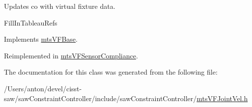 Updates co with virtual fixture data. 

Fill\+In\+Tableau\+Refs 

Implements \hyperlink{classmts_v_f_base_aef5a28675f79945766a2b114c957ae6f}{mts\+V\+F\+Base}.



Reimplemented in \hyperlink{classmts_v_f_sensor_compliance_ade8b115639befe8b99fbe700ef092c06}{mts\+V\+F\+Sensor\+Compliance}.



The documentation for this class was generated from the following file\+:\begin{DoxyCompactItemize}
\item 
/\+Users/anton/devel/cisst-\/saw/saw\+Constraint\+Controller/include/saw\+Constraint\+Controller/\hyperlink{mts_v_f_joint_vel_8h}{mts\+V\+F\+Joint\+Vel.\+h}\end{DoxyCompactItemize}
